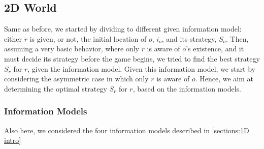 \documentclass[a4paper,english,10pt]{article}
\newcommand\rob{\ensuremath{r}\xspace}
\newcommand\opp{\ensuremath{o}\xspace}
\newcommand{\fcc}{\ensuremath{FCC}\xspace}
\begin{document}


\subsection{2D World}
Same as before, we started by dividing to different given information model: either \rob is given, or not, the initial location of \opp, $i_\opp$, and its strategy, $S_\opp$. Then, assuming a very basic behavior, where only \rob is aware of \opp's existence, and it must decide its strategy before the game begins, we tried to find the best strategy $S_\rob$ for \rob, given the information model.
Given this information model, we start by considering the asymmetric case in which only \rob is aware of \opp. Hence, we aim at determining the optimal strategy $S_\rob$ for \rob, based on the information models.

\subsubsection{Information Models}
Also here, we considered the four information models described in \ref{sections:1D intro}
\end{document}
